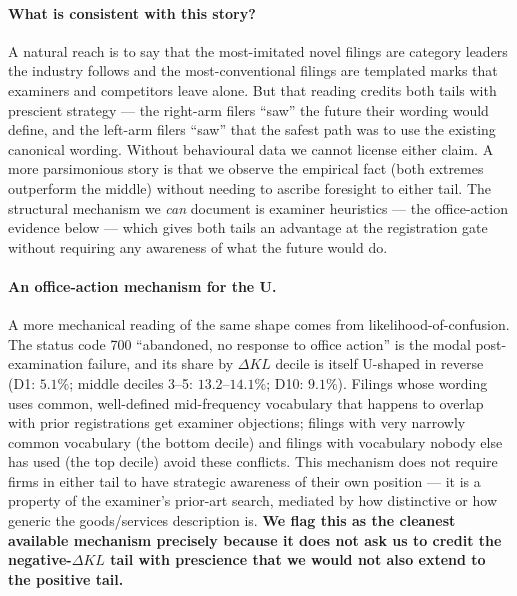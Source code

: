 \documentclass[11pt]{article}
\begin{document}
\paragraph{What is consistent with this story?} A natural reach
is to say that the most-imitated novel filings are category
leaders the industry follows and the most-conventional filings
are templated marks that examiners and competitors leave alone.
But that reading credits both tails with prescient strategy ---
the right-arm filers ``saw'' the future their wording would
define, and the left-arm filers ``saw'' that the safest path
was to use the existing canonical wording. Without behavioural
data we cannot license either claim. A more parsimonious story
is that we observe the empirical fact (both extremes outperform
the middle) without needing to ascribe foresight to either tail.
The structural mechanism we \emph{can} document is examiner
heuristics --- the office-action evidence below ---  which gives
both tails an advantage at the registration gate without
requiring any awareness of what the future would do.

\paragraph{An office-action mechanism for the U.}
A more mechanical reading of the same shape comes from
likelihood-of-confusion. The status code 700 ``abandoned, no
response to office action'' is the modal post-examination
failure, and its share by $\Delta KL$ decile is itself U-shaped
in reverse (D1: $5.1\%$; middle deciles 3--5: $13.2$--$14.1\%$;
D10: $9.1\%$). Filings whose wording uses common, well-defined
mid-frequency vocabulary that happens to overlap with prior
registrations get examiner objections; filings with very narrowly
common vocabulary (the bottom decile) and filings with vocabulary
nobody else has used (the top decile) avoid these conflicts.
This mechanism does not require firms in either tail to have
strategic awareness of their own position --- it is a property
of the examiner's prior-art search, mediated by how distinctive
or how generic the goods/services description is. \textbf{We
flag this as the cleanest available mechanism precisely because
it does not ask us to credit the negative-$\Delta KL$ tail with
prescience that we would not also extend to the positive tail.}
\end{document}
